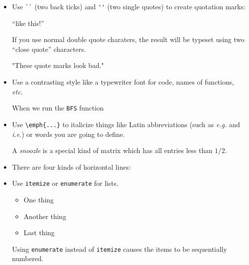 \documentclass{article}
\begin{document}
\begin{itemize}
\item Use \verb|``| (two back ticks) and \verb|''| (two single quotes)
  to create quotation marks:
\begin{good}
``like this!''
\end{good}
If you use normal double quote charaters, the result will be typeset
using two ``close quote'' characters.
\begin{bad}
"These quote marks look bad."
\end{bad}


\item Use a contrasting style like a typewriter font for code, names
  of functions, \emph{etc.}
  \begin{good}When we run the \texttt{BFS} function\end{good}
\item Use \verb|\emph{...}| to italicize things like Latin abbreviations
  (such as \emph{e.g.} and \emph{i.e.}) or words you are going to
  define.
\begin{good}
A \emph{snoozle} is a special kind of matrix which has all entries less than $1/2$.
\end{good}
\item There are four kinds of horizontal lines:
\item Use \verb|itemize| or \verb|enumerate| for lists.
\begin{good}
\begin{itemize}
  \item One thing
  \item Another thing
  \item Last thing
\end{itemize}
\end{good}
  Using \verb|enumerate| instead of \verb|itemize| causes the items to
  be sequentially numbered.


\end{itemize}
\end{document}

